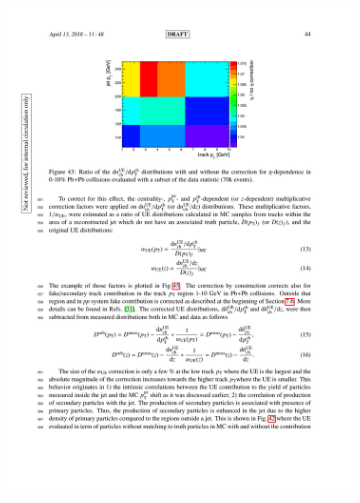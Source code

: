 \begin{figure}
\begin{subfigure}{0.5\textwidth}
\centering \includegraphics[width=1\textwidth]{figures/main/UE/eta_correction.pdf}
\caption{}
\label{fig:eta_corr}
\end{subfigure}
\begin{subfigure}{0.5\textwidth}

\end{subfigure}
\end{figure}
